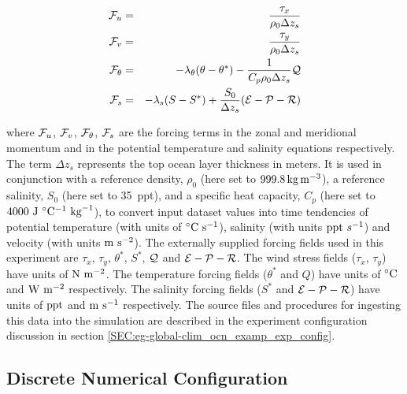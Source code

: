 \begin{eqnarray}
\label{EQ:eg-global-global_forcing}
\label{EQ:eg-global-global_forcing_fu}
{\cal F}_{u} & = & \frac{\tau_{x}}{\rho_{0} \Delta z_{s}}
\\
\label{EQ:eg-global-global_forcing_fv}
{\cal F}_{v} & = & \frac{\tau_{y}}{\rho_{0} \Delta z_{s}}
\\
\label{EQ:eg-global-global_forcing_ft}
{\cal F}_{\theta} & = & - \lambda_{\theta} ( \theta - \theta^{\ast} ) 
 - \frac{1}{C_{p} \rho_{0} \Delta z_{s}}{\cal Q}
\\
\label{EQ:eg-global-global_forcing_fs}
{\cal F}_{s} & = & - \lambda_{s} ( S - S^{\ast} ) 
 + \frac{S_{0}}{\Delta z_{s}}({\cal E} - {\cal P} - {\cal R})
\end{eqnarray}

\noindent where ${\cal F}_{u}$, ${\cal F}_{v}$, ${\cal F}_{\theta}$,
${\cal F}_{s}$ are the forcing terms in the zonal and meridional
momentum and in the potential temperature and salinity
equations respectively.
The term $\Delta z_{s}$ represents the top ocean layer thickness in
meters.
It is used in conjunction with a reference density, $\rho_{0}$
(here set to $999.8\,{\rm kg\,m^{-3}}$), a
reference salinity, $S_{0}$ (here set to 35~ppt),
and a specific heat capacity, $C_{p}$ (here set to
$4000~{\rm J}~^{\circ}{\rm C}^{-1}~{\rm kg}^{-1}$), to convert
input dataset values into time tendencies of
potential temperature (with units of $^{\circ}{\rm C}~{\rm s}^{-1}$),
salinity (with units ${\rm ppt}~s^{-1}$) and
velocity (with units ${\rm m}~{\rm s}^{-2}$).
The externally supplied forcing fields used in this
experiment are $\tau_{x}$, $\tau_{y}$, $\theta^{\ast}$, $S^{\ast}$,
$\cal{Q}$ and $\cal{E}-\cal{P}-\cal{R}$. The wind stress fields ($\tau_x$, $\tau_y$)
have units of ${\rm N}~{\rm m}^{-2}$. The temperature forcing fields
($\theta^{\ast}$ and $Q$) have units of $^{\circ}{\rm C}$ and ${\rm W}~{\rm m}^{-2}$
respectively. The salinity forcing fields ($S^{\ast}$ and 
$\cal{E}-\cal{P}-\cal{R}$) have units of ${\rm ppt}$ and ${\rm m}~{\rm s}^{-1}$
respectively. The source files and procedures for ingesting this data into the
simulation are described in the experiment configuration discussion in section
\ref{SEC:eg-global-clim_ocn_examp_exp_config}.


\subsection{Discrete Numerical Configuration}
\label{www:tutorials}



